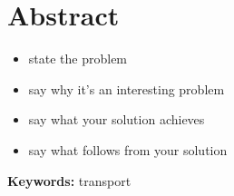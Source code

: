 %
%

\chapter*{Abstract}

\vspace{1cm plus 0.5cm}

\makeatletter
\begin{center}
 \large{\textbf{\@englishtitle}}
\end{center}
\makeatother

\vspace{0.75cm plus 0.5cm}



\begin{itemize}
\tightlist
\item
  state the problem
\item
  say why it's an interesting problem
\item
  say what your solution achieves
\item
  say what follows from your solution
\end{itemize}

\noindent
\lipsum[14]

\vspace{\fill}

\begin{small}
\noindent\textsf{\textbf{Keywords:}
transport}
\end{small}

\thispagestyle{empty}

